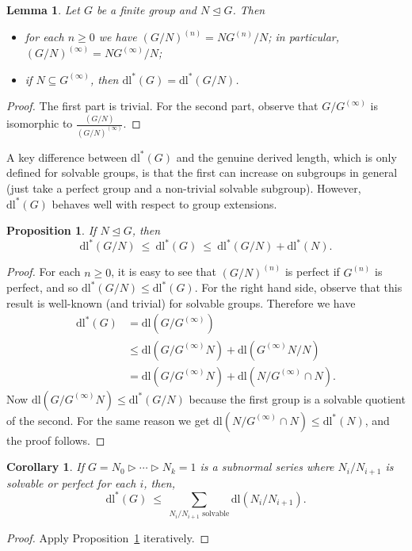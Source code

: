 \documentclass[11pt]{amsart}
\numberwithin{equation}{section}
\newtheorem{lemma}[theorem]{Lemma}
\newtheorem{proposition}[theorem]{Proposition}
\newtheorem{corollary}[theorem]{Corollary}
\theoremstyle{definition}
\theoremstyle{remark}
\newcommand{\dll}{\mathrm{dl^*}}
\newcommand{\dl}{\mathrm{dl}}
\begin{document}
\begin{lemma} \label{lemSubNor} 
    Let $G$ be a finite group and $N \unlhd G$.
    Then
    \begin{itemize}
        \item for each $n \geq 0$ we have $(G/N)^{(n)} = NG^{(n)}/N$;
        in particular, $(G/N)^{(\infty)} = NG^{(\infty)}/N$;
        \item if $N \subseteq G^{(\infty)}$, then $\dll(G) = \dll(G/N)$.
    \end{itemize} 
\end{lemma}
\begin{proof}
    The first part is trivial.
    For the second part, observe that $G/G^{(\infty)}$ is isomorphic to $\frac{(G/N)}{(G/N)^{(\infty)}}$.
\end{proof}

A key difference between $\dll(G)$ and the genuine derived length, which is only defined for solvable groups, is that the first can increase on subgroups in general (just take a perfect group and a non-trivial solvable subgroup).
However, $\dll(G)$ behaves well with respect to group extensions.

\begin{proposition} \label{propGDL}
If $N \unlhd G$, then
$$ \dll(G/N) \> \leq \> \dll(G) \> \leq \> \dll(G/N) + \dll(N) . $$
\end{proposition} 
\begin{proof}
For each $n \geq 0$, it is easy to see that $(G/N)^{(n)}$ is perfect if $G^{(n)}$ is perfect, and so $\dll(G/N) \leq \dll(G)$.
For the right hand side, observe that this result is well-known (and trivial) for solvable groups. Therefore we have
\begin{align*}
    \dll(G) & =  \dl(G/G^{(\infty)}) \\
    & \leq \dl(G/G^{(\infty)}N) + \dl(G^{(\infty)}N/N) \\
    & = \dl(G/G^{(\infty)}N) + \dl(N/G^{(\infty)} \cap N) .
\end{align*}
Now $\dl(G/G^{(\infty)}N) \leq \dll(G/N)$ because the first group is a solvable quotient of the second.
For the same reason we get $\dl(N/G^{(\infty)} \cap N) \leq \dll(N)$,
and the proof follows.
\end{proof}

\begin{corollary} \label{corExt}
If $G=N_0 \rhd \cdots \rhd N_k = 1$ is a subnormal series where $N_i/N_{i+1}$ is solvable or perfect for each $i$,
then,
$$ \dll(G) \> \leq \> 
\sum_{N_i/N_{i+1} \mbox{ solvable}} \dl(N_i/N_{i+1}) . $$
\end{corollary}
\begin{proof}
Apply Proposition~\ref{propGDL} iteratively.
\end{proof}
\end{document}
